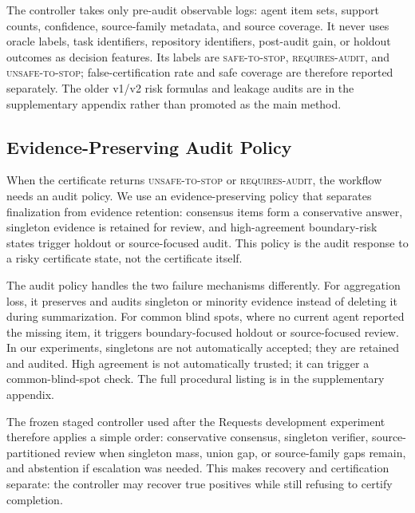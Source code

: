 \documentclass[letterpaper]{article}
\begin{document}
The controller takes only pre-audit observable logs: agent item sets, support
counts, confidence, source-family metadata, and source coverage. It never uses
oracle labels, task identifiers, repository identifiers, post-audit gain, or
holdout outcomes as decision features. Its labels are
\textsc{safe-to-stop}, \textsc{requires-audit}, and \textsc{unsafe-to-stop};
false-certification rate and safe coverage are therefore reported separately.
The older v1/v2 risk formulas and leakage audits are in the supplementary
appendix rather than promoted as the main method.

\subsection{Evidence-Preserving Audit Policy}

When the certificate returns \textsc{unsafe-to-stop} or
\textsc{requires-audit}, the workflow needs an audit policy. We use an
evidence-preserving policy that separates finalization from evidence retention:
consensus items form a conservative answer, singleton evidence is retained for
review, and high-agreement boundary-risk states trigger holdout or source-focused
audit. This policy is the audit response to a risky certificate state, not the
certificate itself.

The audit policy handles the two failure mechanisms differently. For aggregation
loss, it preserves and audits singleton or minority evidence instead of deleting
it during summarization. For common blind spots, where no current agent reported
the missing item, it triggers boundary-focused holdout or source-focused review.
In our experiments, singletons are not automatically accepted; they are retained
and audited. High agreement is not automatically trusted; it can trigger a
common-blind-spot check. The full procedural listing is in the supplementary
appendix.

The frozen staged controller used after the Requests development experiment
therefore applies a simple order: conservative consensus, singleton verifier,
source-partitioned review when singleton mass, union gap, or source-family gaps
remain, and abstention if escalation was needed. This makes recovery and
certification separate: the controller may recover true positives while still
refusing to certify completion.
\end{document}
